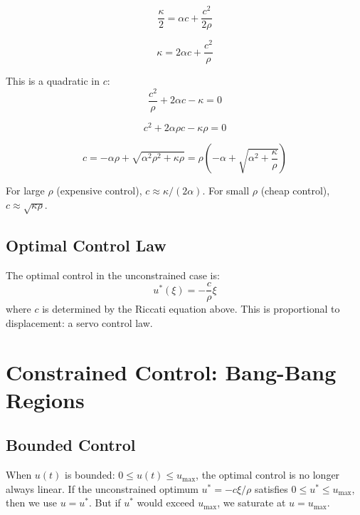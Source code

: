 \documentclass[12pt]{article}
\begin{document}
\begin{equation}
\frac{\kappa}{2} = \alpha c + \frac{c^2}{2\rho}
\end{equation}

\begin{equation}
\kappa = 2\alpha c + \frac{c^2}{\rho}
\end{equation}

This is a quadratic in $c$:
\begin{equation}
\frac{c^2}{\rho} + 2\alpha c - \kappa = 0
\end{equation}

\begin{equation}
c^2 + 2\alpha \rho c - \kappa \rho = 0
\end{equation}

\begin{equation}
c = -\alpha \rho + \sqrt{\alpha^2 \rho^2 + \kappa \rho} = \rho \left( -\alpha + \sqrt{\alpha^2 + \frac{\kappa}{\rho}} \right)
\end{equation}

For large $\rho$ (expensive control), $c \approx \kappa / (2\alpha)$. For small $\rho$ (cheap control), $c \approx \sqrt{\kappa \rho}$.

\subsection{Optimal Control Law}

The optimal control in the unconstrained case is:
\begin{equation}
u^*(\xi) = -\frac{c}{\rho} \xi
\end{equation}
where $c$ is determined by the Riccati equation above. This is proportional to displacement: a servo control law.

\section{Constrained Control: Bang-Bang Regions}

\subsection{Bounded Control}

When $u(t)$ is bounded: $0 \leq u(t) \leq u_{\max}$, the optimal control is no longer always linear. If the unconstrained optimum $u^* = -c \xi / \rho$ satisfies $0 \leq u^* \leq u_{\max}$, then we use $u = u^*$. But if $u^*$ would exceed $u_{\max}$, we saturate at $u = u_{\max}$.
\end{document}
